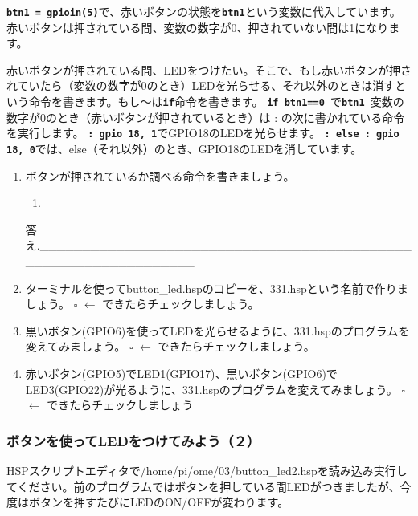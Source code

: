 \documentclass[a4paper,dvipdfmx]{jarticle}
\begin{document}
\texttt{\textbf{btn1 =
gpioin(5)}}で、赤いボタンの状態を\texttt{\textbf{btn1}}という変数に代入しています。赤いボタンは押されている間、変数の数字が0、押されていない間は1になります。

赤いボタンが押されている間、LEDをつけたい。そこで、もし赤いボタンが押されていたら（変数の数字が0のとき）LEDを光らせる、それ以外のときは消すという命令を書きます。もし〜は\texttt{\textbf{if}}命令を書きます。\newline
\texttt{\textbf{if btn1==0 }}で\texttt{\textbf{btn1
}}変数の数字が0のとき（赤いボタンが押されているとき）は
:
の次に書かれている命令を実行します。\newline
\texttt{\textbf{: gpio 18, 1}}でGPIO18のLEDを光らせます。\newline
\texttt{\textbf{: else : gpio 18,
0}}では、else（それ以外）のとき、GPIO18のLEDを消しています。


\bigskip


\begin{enumerate}
\item
ボタンが押されているか調べる命令を書きましょう。

\begin{enumerate}
\item[] 
\bigskip
\end{enumerate}
答え.\_\_\_\_\_\_\_\_\_\_\_\_\_\_\_\_\_\_\_\_\_\_\_\_\_\_\_\_\_\_\_\_\_\_\_\_\_\_\_\_\_\_\_\_\_\_\_\_\_\_\_\_\_\_\_\_\_\_\_\_\_\_\_\_
\item
ターミナルを使ってbutton\_led.hspのコピーを、331.hspという名前で作りましょう。\newline
${\square}$ $\leftarrow $
できたらチェックしましょう。
\item
黒いボタン(GPIO6)を使ってLEDを光らせるように、331.hspのプログラムを変えてみましょう。\newline
${\square}$ $\leftarrow $
できたらチェックしましょう。
\item
赤いボタン(GPIO5)でLED1(GPIO17)、黒いボタン(GPIO6)でLED3(GPIO22)が光るように、331.hspのプログラムを変えてみましょう。\newline
${\square}$ $\leftarrow $ できたらチェックしましょう
\end{enumerate}
\clearpage\subsubsection{ボタンを使ってLEDをつけてみよう（２）}
HSPスクリプトエディタで/home/pi/ome/03/button\_led2.hspを読み込み実行してください。前のプログラムではボタンを押している間LEDがつきましたが、今度はボタンを押すたびにLEDのON/OFFが変わります。
\end{document}
